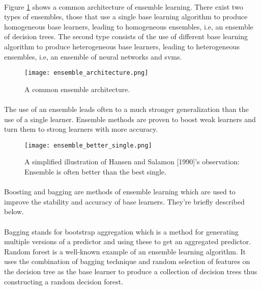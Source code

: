 \paragraph{}
Figure \ref{ensemble_architecture} shows a common architecture of ensemble learning. There exist two types of ensembles,  those that use a single base learning algorithm to produce homogeneous base learners, leading to homogeneous ensembles, i.e, an ensemble of decision trees. The second type consists of the use of different base learning algorithm to produce heterogeneous base learners, leading to heterogeneous ensembles, i.e, an ensemble of neural networks and \acs{svm}s.
\begin{figure}[ht]
 \texttt{[image: ensemble\_architecture.png]}
 \centering         
 \caption{A common ensemble architecture.}
 \label{ensemble_architecture}
\end{figure}
\paragraph{}
The use of an ensemble leads often to a much stronger generalization than the use of a single learner. Ensemble methods are proven to boost weak learners and turn them to strong learners with more accuracy.\cite{MLEL:1}
\begin{figure}[ht]
 \texttt{[image: ensemble\_better\_single.png]}
 \centering         
 \caption{A simplified illustration of Hansen and Salamon [1990]’s observation: Ensemble is often better than the best single.}
 \label{ensemble_better_single}
\end{figure}
\paragraph{}
Boosting and bagging are methods of ensemble learning which are used to improve the stability and accuracy of base learners. They're briefly described below.
\paragraph{}{Bagging}
 stands for bootstrap aggregation which is a method for generating multiple versions of a predictor and using these to get an aggregated predictor\cite{MLELBO:1}. Random forest is a well-known example of an ensemble learning algorithm. It uses the combination of bagging technique\cite{MLRF:1} and random selection of features on the decision tree as the base learner to produce a collection of decision trees thus constructing a random decision forest. 

